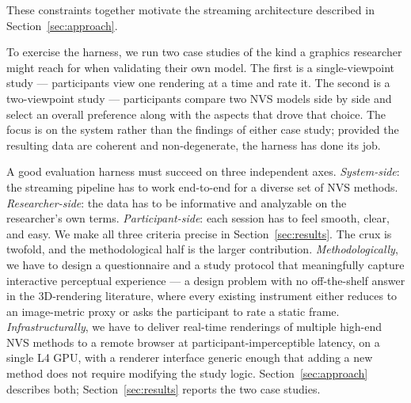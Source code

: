 These constraints together motivate the streaming architecture
described in Section~\ref{sec:approach}.

To exercise the harness, we run two case studies of the kind a graphics
researcher might reach for when validating their own model. The first is
a single-viewpoint study --- participants view one rendering at a time
and rate it. The second is a two-viewpoint study --- participants compare
two NVS models side by side and select an overall preference along with
the aspects that drove that choice. The focus is on the system rather
than the findings of either case study; provided the resulting data are
coherent and non-degenerate, the harness has done its job.

A good evaluation harness must succeed on three independent axes.
\emph{System-side}: the streaming pipeline has to work end-to-end for a
diverse set of NVS methods. \emph{Researcher-side}: the data has to be
informative and analyzable on the researcher's own terms.
\emph{Participant-side}: each session has to feel smooth, clear, and
easy. We make all three criteria precise in
Section~\ref{sec:results}. The crux is twofold, and the methodological
half is the larger contribution. \emph{Methodologically}, we have to
design a questionnaire and a study protocol that meaningfully capture
interactive perceptual experience --- a design problem with no
off-the-shelf answer in the 3D-rendering literature, where every
existing instrument either reduces to an image-metric proxy or asks the
participant to rate a static frame. \emph{Infrastructurally}, we have
to deliver real-time renderings of multiple high-end NVS methods to a
remote browser at participant-imperceptible latency, on a single L4
GPU, with a renderer interface generic enough that adding a new method
does not require modifying the study logic.
Section~\ref{sec:approach} describes both;
Section~\ref{sec:results} reports the two case studies.
